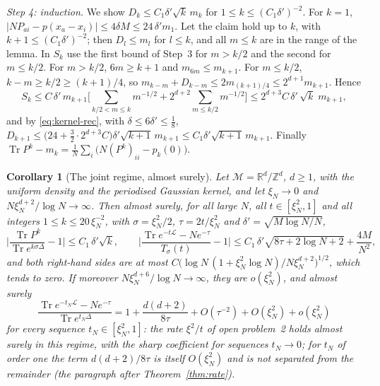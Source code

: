 \documentclass[11pt,a4paper]{article}
\makeatletter
\theoremstyle{stmt}
\newtheorem{corollary}[theorem]{Corollary}
\theoremstyle{defn}
\theoremstyle{rmk}
\renewenvironment{proof}[1][\proofname]{\par\pushQED{\qed}\normalfont\topsep6\p@\@plus6\p@\relax
  \trivlist\item[\hskip\labelsep{\sffamily\itshape\small #1.}]\ignorespaces}{\popQED\endtrivlist\@endpefalse}
\numberwithin{equation}{section}
\DeclareMathOperator{\Tr}{Tr}
\newcommand{\M}{\mathcal{M}}
\newcommand{\Lc}{\mathcal{L}}
\newcommand{\R}{\mathbb{R}}
\makeatother
\begin{document}
{\begin{proof}
\emph{Step 4: induction.} We show $D_k\le C_1\delta'\sqrt k\,m_k$ for $1\le k\le(C_1\delta')^{-2}$. For $k=1$, $|NP_{ai}-p(x_a-x_i)|\le4\delta M\le24\,\delta'm_1$. Let the claim hold up to $k$, with $k+1\le(C_1\delta')^{-2}$; then $D_l\le m_l$ for $l\le k$, and all $m\le k$ are in the range of the lemma. In $S_k$ use the first bound of Step~3 for $m>k/2$ and the second for $m\le k/2$. For $m>k/2$, $6m\ge k+1$ and $m_{6m}\le m_{k+1}$. For $m\le k/2$, $k-m\ge k/2\ge(k+1)/4$, so $m_{k-m}+D_{k-m}\le2m_{(k+1)/4}\le2^{d+1}m_{k+1}$. Hence
\[
S_k\le C\,\delta'\,m_{k+1}\Big[\sum_{k/2<m\le k}m^{-1/2}+2^{d+2}\sum_{m\le k/2}m^{-1/2}\Big]\le2^{d+3}C\,\delta'\,\sqrt k\;m_{k+1},
\]
and by \eqref{eq:kernel-rec}, with $\delta\le6\delta'\le\frac18$, $D_{k+1}\le\big(24+\tfrac32\cdot2^{d+3}C\big)\delta'\sqrt{k+1}\,m_{k+1}\le C_1\delta'\sqrt{k+1}\,m_{k+1}$. Finally $\Tr P^k-m_k=\frac1N\sum_i\big(N(P^k)_{ii}-p_k(0)\big)$.
\end{proof}

\begin{corollary}[The joint regime, almost surely]\label{cor:kernel-trace}
Let $\M=\R^d/\mathbb Z^d$, $d\ge1$, with the uniform density and the periodised Gaussian kernel, and let $\xi_N\to0$ and $N\xi_N^{d+2}/\log N\to\infty$. Then almost surely, for all large $N$, all $t\in[\xi_N^2,1]$ and all integers $1\le k\le20\,\xi_N^{-2}$, with $\sigma=\xi_N^2/2$, $\tau=2t/\xi_N^2$ and $\delta'=\sqrt{M\log N/N}$,
\[
\Big|\frac{\Tr P^k}{\Tr e^{k\sigma\Delta}}-1\Big|\le C_1\,\delta'\sqrt k,\qquad\Big|\frac{\Tr e^{-t\Lc}-Ne^{-\tau}}{T_\sigma(t)}-1\Big|\le C_1\,\delta'\sqrt{8\tau+2\log N+2}+\frac{4M}{N^2},
\]
and both right-hand sides are at most $C\big(\log N\,(1+\xi_N^2\log N)/N\xi_N^{d+2}\big)^{1/2}$, which tends to zero. If moreover $N\xi_N^{d+6}/\log N\to\infty$, they are $o(\xi_N^2)$, and almost surely
\[
\frac{\Tr e^{-t_N\Lc}-Ne^{-\tau}}{\Tr e^{t_N\Delta}}=1+\frac{d(d+2)}{8\tau}+O(\tau^{-2})+O(\xi_N^2)+o(\xi_N^2)
\]
for every sequence $t_N\in[\xi_N^2,1]$: the rate $\xi^2/t$ of open problem~2 holds almost surely in this regime, with the sharp coefficient for sequences $t_N\to0$; for $t_N$ of order one the term $d(d+2)/8\tau$ is itself $O(\xi_N^2)$ and is not separated from the remainder (the paragraph after Theorem~\ref{thm:rate}).
\end{corollary}

}
\end{document}
